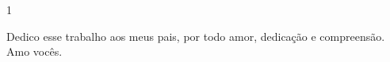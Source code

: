 \newpage
\thispagestyle{empty}
\begin{spacing}{1}
	\vspace*{\fill}

	\noindent
	\hfill\parbox{9cm}{Dedico esse trabalho aos meus pais, por todo amor, dedicação e compreensão. Amo vocês.}

\end{spacing}
